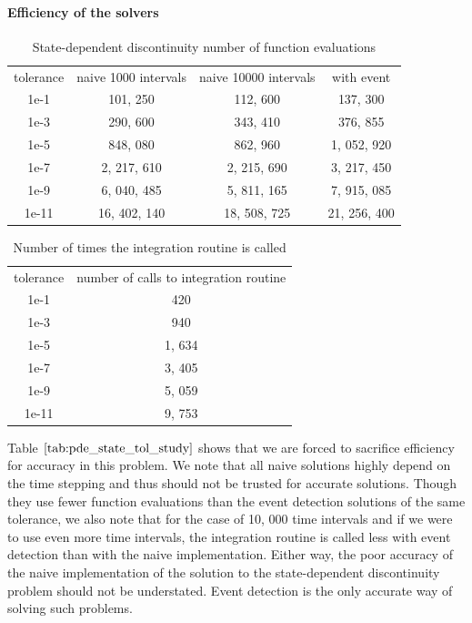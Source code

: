 \documentclass{article}
\begin{document}
\paragraph{Efficiency of the solvers}
\begin{table}[h]
\caption {State-dependent discontinuity number of function evaluations} 
\label{tab:pde_state_tol_study}
\begin{center}
\begin{tabular}{ c c c c } 
tolerance & naive 1000 intervals & naive 10000 intervals & with event \\ 
1e-1      &             101, 250 &              112, 600 &     137, 300 \\
1e-3      &             290, 600 &              343, 410 &     376, 855 \\
1e-5      &             848, 080 &              862, 960 &  1, 052, 920 \\
1e-7      &          2, 217, 610 &           2, 215, 690 &  3, 217, 450\\
1e-9      &          6, 040, 485 &           5, 811, 165 &  7, 915, 085  \\
1e-11     &         16, 402, 140 &          18, 508, 725 & 21, 256, 400 \\
\end{tabular}
\end{center}
\end{table}

\begin{table}[h]
\caption {Number of times the integration routine is called} 
\label{tab:pde_state_tol_num_integrations}
\begin{center}
\begin{tabular}{ c c } 
tolerance & number of calls to integration routine \\ 
1e-1      &    420 \\
1e-3      &    940 \\
1e-5      & 1, 634 \\
1e-7      & 3, 405 \\
1e-9      & 5, 059 \\
1e-11     & 9, 753 \\
\end{tabular}
\end{center}
\end{table}

Table $\ref{tab:pde_state_tol_study}$ shows that we are forced to sacrifice efficiency for accuracy in this problem. We note that all naive solutions highly depend on the time stepping and thus should not be trusted for accurate solutions. Though they use fewer function evaluations than the event detection solutions of the same tolerance, we also note that for the case of 10, 000 time intervals and if we were to use even more time intervals, the integration routine is called less with event detection than with the naive implementation. Either way, the poor accuracy of the naive implementation of the solution to the state-dependent discontinuity problem should not be understated. Event detection is the only accurate way of solving such problems. 
\end{document}
